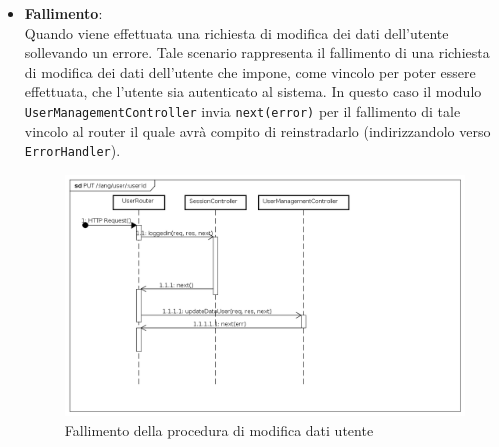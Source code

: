 \begin{itemize}
\item \textbf{Fallimento}:
\\
Quando viene effettuata una richiesta di modifica dei dati dell'utente sollevando un errore. Tale scenario rappresenta il fallimento di una richiesta di modifica dei dati dell'utente che impone, come vincolo per poter essere effettuata, che l'utente sia autenticato al sistema. In questo caso il modulo \texttt{UserManagementController} invia \texttt{next(error)} per il fallimento di tale vincolo al router il quale avrà compito di reinstradarlo (indirizzandolo verso \texttt{ErrorHandler}).
\label{Fallimento della procedura di modifica dati utente}
\begin{figure}[ht]
	\centering
	\includegraphics[scale=0.40]{UML/DiagrammiDiSequenza/Back-end/PUT_LangUserUseridFailure.png}
	
	\caption{Fallimento della procedura di modifica dati utente}
\end{figure}
\FloatBarrier
\end{itemize}

